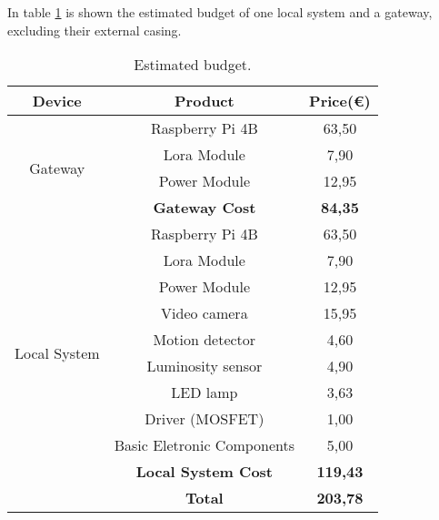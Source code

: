 In table \ref{table:data} is shown the estimated budget of one local system and a gateway, excluding their external casing.

\begin{table}[ht]
	\centering
	
	\begin{tabular}{||c | c | c||} 
		\hline
		\textbf{Device} & \textbf{Product} & \textbf{Price(€)}\\
		\hline\hline
		
		\multirow{4}{4em}{Gateway} & Raspberry Pi 4B & 63,50				\\
								   & Lora Module & 7,90 					\\
								   & Power Module & 12,95	\\
								   & \textbf{Gateway Cost} & \textbf{84,35}	\\
		\hline
		
		\multirow{10}{4em}{Local System} & Raspberry Pi 4B & 63,50					\\
								         & Lora Module & 7,90 						\\
								         & Power Module & 12,95		\\
								         & Video camera & 15,95						\\
								         & Motion detector & 4,60					\\
								         & Luminosity sensor & 4,90					\\
								         & LED lamp & 3,63						\\
								         & Driver (MOSFET) & 1,00					\\
								         & Basic Eletronic Components & 5,00		\\
								         & \textbf{Local System Cost} & \textbf{119,43}\\
		\hline\hline
		 & \textbf{Total} & \textbf{203,78}\\\hline
	\end{tabular}
	\caption{Estimated budget.}
	\label{table:data}
\end{table}